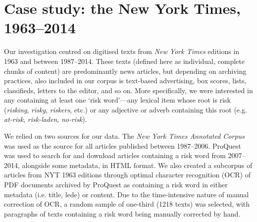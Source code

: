 
\chapter{Case study: the New York Times, 1963--2014}

	Our investigation centred on digitised texts from \emph{New York Times} editions in 1963 and between 1987--2014. These texts (defined here as individual, complete chunks of content) are predominantly news articles, but depending on archiving practices, also included in our corpus is text-based advertising, box scores, lists, classifieds, letters to the editor, and so on. More specifically, we were interested in any  containing at least one `risk word'---any lexical item whose root is risk (\emph{risking}, \emph{risky}, \emph{riskers}, etc.) or any adjective or adverb containing this root (e.g. \emph{at-risk}, \emph{risk-laden}, \emph{no-risk}).~

	We relied on two sources for our data. The \emph{New York Times Annotated Corpus} \cite{sandhaus_new_2008} was used as the source for all articles published between 1987--2006. ProQuest was used to search for and download articles containing a risk word from 2007--2014, alongside some metadata, in HTML format. We also created a subcorpus of articles from NYT 1963 editions through optimal character recognition (OCR) of PDF documents archived by ProQuest as containing a risk word in either metadata (i.e. title, lede) or content. Due to the time-intensive nature of manual correction of OCR, a random sample of one-third (1218 texts) was selected, with paragraphs of texts containing a risk word being manually corrected by hand.

